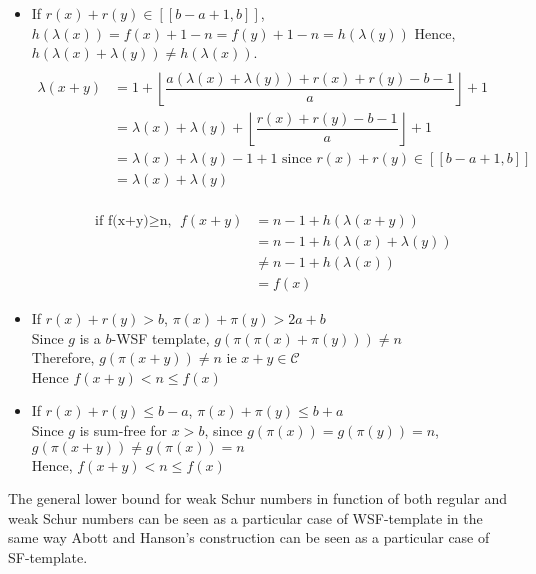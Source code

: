 \begin{itemize}
\item If \(r(x)+r(y) \in [\![b-a+1,b]\!]\), \(h(\lambda(x))=f(x)+1-n=f(y)+1-n=h(\lambda(y))\)
Hence, \(h(\lambda(x)+\lambda(y)) \neq h(\lambda(x))\).
\begin{align*}
 \\\lambda(x+y) & =1+\left\lfloor\dfrac{a(\lambda(x)+\lambda(y))+r(x)+r(y)-b-1}{a}\right\rfloor+1\\
& = \lambda(x)+\lambda(y)+\left\lfloor\dfrac{r(x)+r(y)-b-1}{a}\right\rfloor+1 \\
& = \lambda(x)+\lambda(y) -1 +1 \text{ since } r(x)+r(y) \in [\![b-a+1,b]\!] \\
& =\lambda(x)+\lambda(y)
\end{align*}


\begin{align*}
 \\\text{if f(x+y)\(\geqslant\)n, }f(x+y) & =n-1+h(\lambda(x+y))\\
& =n-1+h(\lambda(x)+\lambda(y)) \\
& \neq n-1+h(\lambda(x))\\
& =f(x)
\end{align*}


\item If \(r(x)+r(y)>b\), \(\pi(x)+\pi(y)>2a+b\)
\\Since \(g\) is a \(b\)-WSF template, \(g(\pi(\pi(x)+\pi(y))) \neq n\)
\\Therefore, \(g(\pi(x+y)) \neq n\) ie \(x+y \in \mathcal{C}\)
\\Hence \(f(x+y) <n\leqslant f(x)\)
\item If \(r(x)+r(y) \leqslant b - a\), \(\pi(x)+\pi(y)\leqslant b+a\)
\\Since \(g\) is sum-free for \(x>b\), since \(g(\pi(x)) = g(\pi(y))=n\), \(g(\pi(x+y)) \neq g(\pi(x))=n\)
\\Hence, \(f(x+y) <n\leqslant f(x)\)
\end{itemize}

\begin{corollary}
The general lower bound for weak Schur numbers in function of both regular and weak Schur numbers can be seen as a particular
case of WSF-template in the same way Abott and Hanson's construction can be seen as a particular case of SF-template.
\end{corollary}

